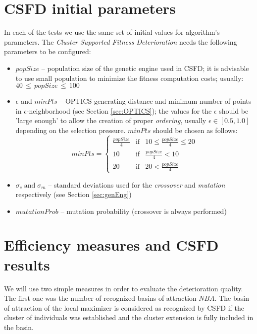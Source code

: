 \section{CSFD initial parameters}
\label{sec:InitPar}


In each of the tests we use the same set of initial values for algorithm's
parameters. The \textit{Cluster Supported Fitness Deterioration} needs the
following parameters to be configured: 
\begin{itemize}
  
  \item $popSize$ -- population size of the genetic engine used in CSFD;
  it is advisable to use small population to minimize the fitness computation
  costs; usually: $40 \, \leq \, popSize \, \leq \, 100$
  
  \item $\epsilon$ and $minPts$ -- OPTICS generating distance and minimum number
  of points in $\epsilon$-neighborhood (see Section \ref{sec:OPTICS});
  the values for the $\epsilon$ should be 'large enough' to allow
  the creation of proper \textit{ordering}, usually $\epsilon \in [0.5, 1.0]$
  depending on the selection pressure. $minPts$ should be chosen as follows:
  \begin{equation}
  \label{eqn:minPts}
  minPts = \left\{
  \begin{array}{ccc}
  \frac{popSize}{4} & \text{if} & 10 \leq \frac{popSize}{4} \leq  20\\
  10 & \text{if} & \frac{popSize}{4} < 10\\
  20 & \text{if} & 20 < \frac{popSize}{4}
  \end{array}
  \right.
  \end{equation}
  
  \item $\sigma_c \; \text{and} \; \sigma_m$ -- standard
  deviations used for the \textit{crossover} and \textit{mutation} respectively
  (see Section \ref{sec:genEng})
  
  \item $mutationProb$ -- mutation probability (crossover is always performed)
   
\end{itemize}

\section{Efficiency measures and CSFD results}
\label{sec:Measures}
We will use two simple measures in order to evaluate the deterioration
quality. The first one was the number of recognized basins of
attraction $NBA$.
The basin of attraction of the local maximizer is considered as recognized
by CSFD if the cluster of individuals was established and 
the cluster extension is fully included in the basin.


